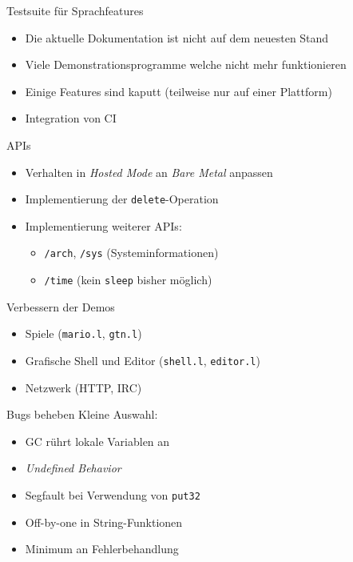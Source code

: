 \documentclass[presentation]{beamer}
\begin{document}
\begin{frame}[label=sec-5-3]{Testsuite für Sprachfeatures}
\begin{itemize}
\item Die aktuelle Dokumentation ist nicht auf dem neuesten Stand
\item Viele Demonstrationsprogramme welche nicht mehr funktionieren
\item Einige Features sind kaputt (teilweise nur auf einer Plattform)
\item Integration von CI
\end{itemize}
\end{frame}

\begin{frame}[fragile,label=sec-5-4]{APIs}
 \begin{itemize}
\item Verhalten in \emph{Hosted Mode} an \emph{Bare Metal} anpassen
\item Implementierung der \texttt{delete}-Operation
\item Implementierung weiterer APIs:
\begin{itemize}
\item \texttt{/arch}, \texttt{/sys} (Systeminformationen)
\item \texttt{/time} (kein \texttt{sleep} bisher möglich)
\end{itemize}
\end{itemize}
\end{frame}

\begin{frame}[fragile,label=sec-5-5]{Verbessern der Demos}
 \begin{itemize}
\item Spiele (\texttt{mario.l}, \texttt{gtn.l})
\item Grafische Shell und Editor (\texttt{shell.l}, \texttt{editor.l})
\item Netzwerk (HTTP, IRC)
\end{itemize}
\end{frame}

\begin{frame}[fragile,label=sec-5-6]{Bugs beheben}
 Kleine Auswahl:
\begin{itemize}
\item GC rührt lokale Variablen an
\item \emph{Undefined Behavior}
\item Segfault bei Verwendung von \texttt{put32}
\item Off-by-one in String-Funktionen
\item Minimum an Fehlerbehandlung
\end{itemize}
\end{frame}
\end{document}
